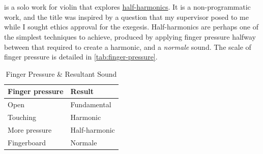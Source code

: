 
\section{\violinPiece}\label{sec:violinPiece}
\hyperref[violinPiece]{\violinPiece} is a solo work for violin that explores \hyperref[sec:halfHarmonicsDiscussion]{half-harmonics}.
It is a non-programmatic work, and the title was inspired by a question that my supervisor posed to me while I sought ethics approval for the exegesis.
Half-harmonics are perhaps one of the simplest techniques to achieve, produced by applying finger pressure halfway between that required to create a harmonic, and a \emph{normale} sound.
The scale of finger pressure is detailed in \autoref{tab:finger-pressure}.
\begin{table}[]
    \centering
    \caption{Finger Pressure \& Resultant Sound}\label{tab:finger-pressure}
    \begin{tabular}{@{}ll@{}}
    \toprule
    Finger pressure & Result        \\ \midrule
    Open            & Fundamental   \\
    Touching        & Harmonic      \\
    More pressure   & Half-harmonic \\
    Fingerboard     & Normale       \\ \bottomrule
    \end{tabular}%
    \end{table}

